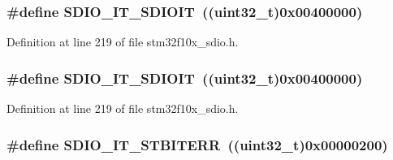 \subsubsection[{\texorpdfstring{S\+D\+I\+O\+\_\+\+I\+T\+\_\+\+S\+D\+I\+O\+IT}{SDIO_IT_SDIOIT}}]{\setlength{\rightskip}{0pt plus 5cm}\#define S\+D\+I\+O\+\_\+\+I\+T\+\_\+\+S\+D\+I\+O\+IT~(({\bf uint32\+\_\+t})0x00400000)}\hypertarget{group___s_d_i_o___interrupt__sources_gaf5d7559460a9ff1fccc82d815de25cb4}{}\label{group___s_d_i_o___interrupt__sources_gaf5d7559460a9ff1fccc82d815de25cb4}


Definition at line 219 of file stm32f10x\+\_\+sdio.\+h.

\subsubsection[{\texorpdfstring{S\+D\+I\+O\+\_\+\+I\+T\+\_\+\+S\+D\+I\+O\+IT}{SDIO_IT_SDIOIT}}]{\setlength{\rightskip}{0pt plus 5cm}\#define S\+D\+I\+O\+\_\+\+I\+T\+\_\+\+S\+D\+I\+O\+IT~(({\bf uint32\+\_\+t})0x00400000)}\hypertarget{group___s_d_i_o___interrupt__sources_gaf5d7559460a9ff1fccc82d815de25cb4}{}\label{group___s_d_i_o___interrupt__sources_gaf5d7559460a9ff1fccc82d815de25cb4}


Definition at line 219 of file stm32f10x\+\_\+sdio.\+h.

\subsubsection[{\texorpdfstring{S\+D\+I\+O\+\_\+\+I\+T\+\_\+\+S\+T\+B\+I\+T\+E\+RR}{SDIO_IT_STBITERR}}]{\setlength{\rightskip}{0pt plus 5cm}\#define S\+D\+I\+O\+\_\+\+I\+T\+\_\+\+S\+T\+B\+I\+T\+E\+RR~(({\bf uint32\+\_\+t})0x00000200)}\hypertarget{group___s_d_i_o___interrupt__sources_ga55f7e65ed1b70d5a6abdc3cc41b55766}{}\label{group___s_d_i_o___interrupt__sources_ga55f7e65ed1b70d5a6abdc3cc41b55766}


